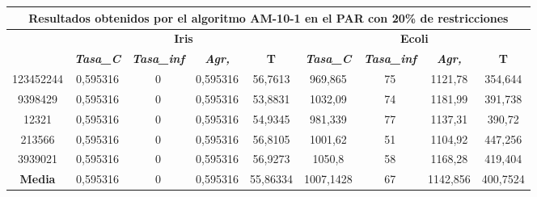 \documentclass[12pt, spanish]{article}
\begin{document}
\begin{table}[H]
\footnotesize
\begin{tabular}{|c|c|c|c|c|c|c|c|c|}
\hline
\multicolumn{9}{|c|}{\textbf{Resultados obtenidos por el algoritmo AM-10-1 en el PAR con 20\% de restricciones}}                                                                                                  \\ \hline
\multirow{2}{*}{} & \multicolumn{4}{c|}{\textbf{Iris}}                                                            & \multicolumn{4}{c|}{\textbf{Ecoli}}                                                           \\ \cline{2-9} 
                  & \textit{\textbf{Tasa\_C}} & \textit{\textbf{Tasa\_inf}} & \textit{\textbf{Agr,}} & \textbf{T} & \textit{\textbf{Tasa\_C}} & \textit{\textbf{Tasa\_inf}} & \textit{\textbf{Agr,}} & \textbf{T} \\ \hline
123452244         & 0,595316                  & 0                           & 0,595316               & 56,7613    & 969,865                   & 75                          & 1121,78                & 354,644    \\ \hline
9398429           & 0,595316                  & 0                           & 0,595316               & 53,8831    & 1032,09                   & 74                          & 1181,99                & 391,738    \\ \hline
12321             & 0,595316                  & 0                           & 0,595316               & 54,9345    & 981,339                   & 77                          & 1137,31                & 390,72     \\ \hline
213566            & 0,595316                  & 0                           & 0,595316               & 56,8105    & 1001,62                   & 51                          & 1104,92                & 447,256    \\ \hline
3939021           & 0,595316                  & 0                           & 0,595316               & 56,9273    & 1050,8                    & 58                          & 1168,28                & 419,404    \\ \hline
\textbf{Media}    & 0,595316                  & 0                           & 0,595316               & 55,86334   & 1007,1428                 & 67                          & 1142,856               & 400,7524   \\ \hline
\end{tabular}
\end{table}
\end{document}
